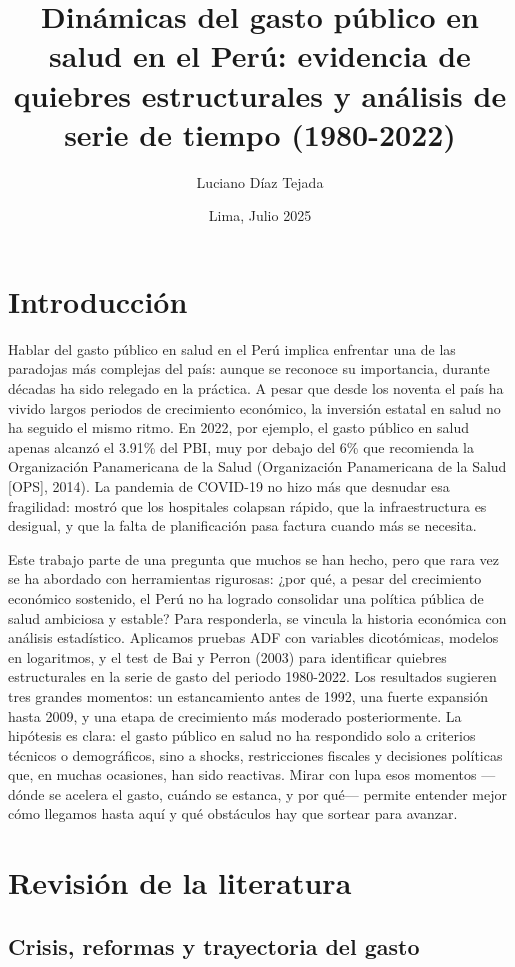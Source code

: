 \documentclass[12pt]{article}
\title{Dinámicas del gasto público en salud en el Perú: evidencia de quiebres estructurales y análisis de serie de tiempo (1980-2022)}
\author{Luciano Díaz Tejada}
\date{Lima, Julio 2025}
\begin{document}
\maketitle
\section{Introducción}

Hablar del gasto público en salud en el Perú implica enfrentar una de las paradojas más complejas del país: aunque se reconoce su importancia, durante décadas ha sido relegado en la práctica. A pesar que desde los noventa el país ha vivido largos periodos de crecimiento económico, la inversión estatal en salud no ha seguido el mismo ritmo. En 2022, por ejemplo, el gasto público en salud apenas alcanzó el 3.91\% del PBI, muy por debajo del 6\% que recomienda la Organización Panamericana de la Salud (Organización Panamericana de la Salud [OPS], 2014). La pandemia de COVID-19 no hizo más que desnudar esa fragilidad: mostró que los hospitales colapsan rápido, que la infraestructura es desigual, y que la falta de planificación pasa factura cuando más se necesita.


Este trabajo parte de una pregunta que muchos se han hecho, pero que rara vez se ha abordado con herramientas rigurosas: ¿por qué, a pesar del crecimiento económico sostenido, el Perú no ha logrado consolidar una política pública de salud ambiciosa y estable? Para responderla, se vincula la historia económica con análisis estadístico. Aplicamos pruebas ADF con variables dicotómicas, modelos en logaritmos, y el test de Bai y Perron (2003) para identificar quiebres estructurales en la serie de gasto del periodo 1980-2022. Los resultados sugieren tres grandes momentos: un estancamiento antes de 1992, una fuerte expansión hasta 2009, y una etapa de crecimiento más moderado posteriormente. La hipótesis es clara: el gasto público en salud no ha respondido solo a criterios técnicos o demográficos, sino a shocks, restricciones fiscales y decisiones políticas que, en muchas ocasiones, han sido reactivas. Mirar con lupa esos momentos —dónde se acelera el gasto, cuándo se estanca, y por qué— permite entender mejor cómo llegamos hasta aquí y qué obstáculos hay que sortear para avanzar.

\bigskip
\bigskip
\section{Revisión de la literatura}

\subsection{Crisis, reformas y trayectoria del gasto}
\end{document}
